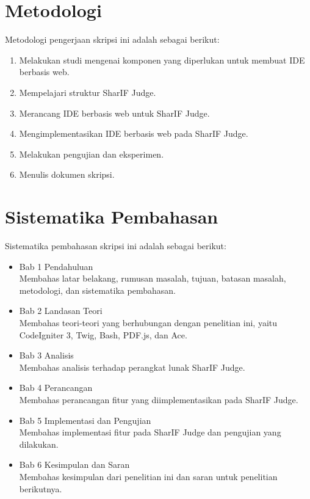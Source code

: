 \section{Metodologi}
\label{sec:metlit}
Metodologi pengerjaan skripsi ini adalah sebagai berikut:
\begin{enumerate}
	\item Melakukan studi mengenai komponen yang diperlukan untuk membuat IDE berbasis web.
	\item Mempelajari struktur SharIF Judge.
	\item Merancang IDE berbasis web untuk SharIF Judge.
	\item Mengimplementasikan IDE berbasis web pada SharIF Judge.
	\item Melakukan pengujian dan eksperimen.
	\item Menulis dokumen skripsi.
\end{enumerate}

\section{Sistematika Pembahasan}
\label{sec:sispem}
Sistematika pembahasan skripsi ini adalah sebagai berikut:
\begin{itemize}
	\item Bab 1 Pendahuluan \\ Membahas latar belakang, rumusan masalah, tujuan, batasan masalah, metodologi, dan sistematika pembahasan.
	\item Bab 2 Landasan Teori \\ Membahas teori-teori yang berhubungan dengan penelitian ini, yaitu CodeIgniter 3, Twig, Bash, PDF.js, dan Ace.
	\item Bab 3 Analisis \\ Membahas analisis terhadap perangkat lunak SharIF Judge.
	\item Bab 4 Perancangan \\ Membahas perancangan fitur yang diimplementasikan pada SharIF Judge.
	\item Bab 5 Implementasi dan Pengujian \\ Membahas implementasi fitur pada SharIF Judge dan pengujian yang dilakukan.
	\item Bab 6 Kesimpulan dan Saran \\ Membahas kesimpulan dari penelitian ini dan saran untuk penelitian berikutnya.
\end{itemize}
